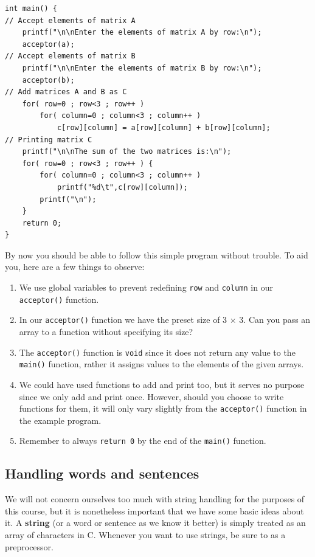 \documentclass[11pt,oneside]{article}
\begin{document}
{{{{{{{{{\begin{lstlisting}
int main() {
// Accept elements of matrix A
    printf("\n\nEnter the elements of matrix A by row:\n");
    acceptor(a);
// Accept elements of matrix B
    printf("\n\nEnter the elements of matrix B by row:\n");
    acceptor(b);
// Add matrices A and B as C
    for( row=0 ; row<3 ; row++ )
        for( column=0 ; column<3 ; column++ )
            c[row][column] = a[row][column] + b[row][column];
// Printing matrix C
    printf("\n\nThe sum of the two matrices is:\n");
    for( row=0 ; row<3 ; row++ ) {
        for( column=0 ; column<3 ; column++ )
            printf("%d\t",c[row][column]);
        printf("\n");
    }  
    return 0;
}
\end{lstlisting}
\vspace*{0.5cm}
By now you should be able to follow this simple program without trouble. To aid you, here are a few things to observe: \vspace*{-0.7em}
\begin{enumerate}
\itemsep-0.45em
\item We use global variables to prevent redefining \verb+row+ and \verb+column+ in our \verb+acceptor()+ function.
\item In our \verb+acceptor()+ function we have the preset size of 3 $\times$ 3. Can you pass an array to a function without specifying its size?
\item The \verb+acceptor()+ function is \verb+void+ since it does not return any value to the \verb+main()+ function, rather it assigns values to the elements of the given arrays.
\item We could have used functions to add and print too, but it serves no purpose since we only add and print once. However, should you choose to write functions for them, it will only vary slightly from the \verb+acceptor()+ function in the example program.
\item Remember to always \verb+return 0+ by the end of the \verb+main()+ function.
\end{enumerate}\vspace*{-0.8em}

\subsection{Handling words and sentences}

We will not concern ourselves too much with string handling for the purposes of this course, but it is nonetheless important that we have some basic ideas about it. A \textbf{string} (or a word or sentence as we know it better) is simply treated as an array of characters in C. Whenever you want to use strings, be sure to  as a preprocessor.

}}}}}}}}}
\end{document}
